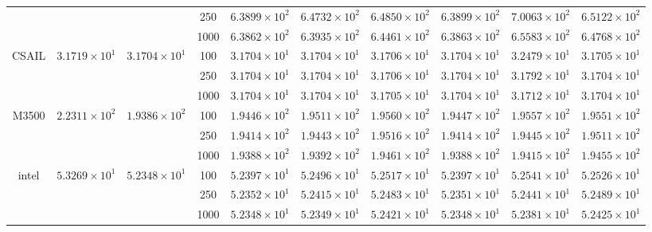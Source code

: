 \begin{table*}[t]
\begin{tabular}{|c||c|c||c|c|c||c|c|c|c|}
		\cline{4-10}
    & &
    &250 &\color{ao}$6.3899\times 10^2$ & $6.4732\times 10^2$ &$6.4850\times 10^2$ &\color{ao}$6.3899\times 10^2$ &$7.0063\times 10^2$ & $6.5122\times 10^2$\\
		\cline{4-10}
    & & & 1000 & \color{ao}$6.3862\times 10^2$ & $6.3935\times 10^2$ &$6.4461\times 10^2$ &\color{ao}$6.3863\times 10^2$ &$6.5583\times 10^2$ & $6.4768\times 10^2$\\
		\hline
		\multirow{3}{*}{\sf CSAIL} &\multirow{3}{*}{$3.1719\times 10^1$} &\multirow{3}{*}{$3.1704\times 10^1$}
    &100 & \color{ao}$3.1704\times10^1$ & \color{ao}$3.1704\times10^1$ & $3.1706\times10^1$ & \color{ao}$3.1704\times10^1$ & $3.2479\times10^1$ & $3.1705\times10^1$ \\
		\cline{4-10}
		& &
    &250 & \color{ao}$3.1704\times10^1$ & \color{ao}$3.1704\times10^1$ & $3.1706\times10^1$ & \color{ao}$3.1704\times10^1$ & $3.1792\times10^1$ & \color{ao}$3.1704\times10^1$ \\
		\cline{4-10}
		& &
    &1000 & \color{ao}$3.1704\times10^1$ & \color{ao}$3.1704\times10^1$ & $3.1705\times10^1$ & \color{ao}$3.1704\times10^1$ & $3.1712\times10^1$ & \color{ao}$3.1704\times10^1$ \\
		\hline
		\multirow{3}{*}{\sf M3500} &\multirow{3}{*}{$2.2311\times 10^2$} &\multirow{3}{*}{$1.9386\times 10^2$}
    &100 & \color{red}$1.9446\times10^2$ & $1.9511\times10^2$ & $1.9560\times10^2$ & \color{blue}$1.9447\times10^2$ & $1.9557\times10^2$ & $1.9551\times10^2$ \\
		\cline{4-10}
		& &
    &250 & \color{red}$1.9414\times10^2$ & $1.9443\times10^2$ & $1.9516\times10^2$ & \color{red}$1.9414\times10^2$ & $1.9445\times10^2$ & $1.9511\times10^2$ \\
		\cline{4-10}
		& &
    &1000 & \color{red}$1.9388\times10^2$ & $1.9392\times10^2$ & $1.9461\times10^2$ & \color{red}$1.9388\times10^2$ & $1.9415\times10^2$ & $1.9455\times10^2$ \\
		\hline
		\multirow{3}{*}{\sf intel} &\multirow{3}{*}{$5.3269\times 10^1$} &\multirow{3}{*}{$5.2348\times 10^1$}
    &100 & \color{red}$5.2397\times10^1$ & $5.2496\times10^1$ & $5.2517\times 10^1$ & \color{red}$5.2397\times 10^1$ & $5.2541\times 10^1$ & $5.2526\times10^1$ \\
		\cline{4-10}
		& &
    &250 & \color{blue}$5.2352\times10^1$ & $5.2415\times10^1$ & $5.2483\times 10^1$ & \color{red}$5.2351\times 10^1$ & $5.2441\times 10^1$ & $5.2489\times10^1$ \\
		\cline{4-10}
		& &
    &1000 & \color{red}$5.2348\times10^1$ & $5.2349\times10^1$ & $5.2421\times 10^1$ & \color{red}$5.2348\times 10^1$ & $5.2381\times 10^1$ & $5.2425\times10^1$ \\

\end{tabular}
\end{table*}
